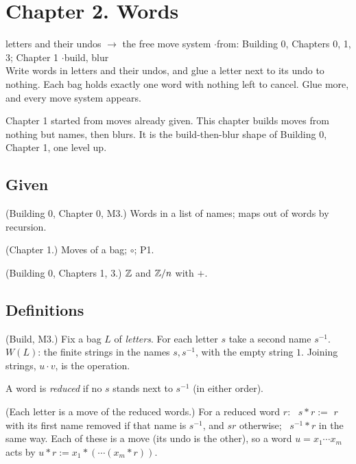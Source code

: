 \section*{Chapter 2. Words}
\begin{center}
{\normalsize letters and their undos $\to$ the free move system \quad$\cdot$\quad from: Building 0, Chapters 0, 1, 3; Chapter 1 \quad$\cdot$\quad build, blur}\\[4pt]
{\small Write words in letters and their undos, and glue a letter next to its undo to nothing. Each bag holds exactly one word with nothing left to cancel. Glue more, and every move system appears.}
\end{center}

Chapter 1 started from moves already given. This chapter builds moves from nothing but names, then blurs. It is the build-then-blur shape of Building 0, Chapter 1, one level up.

\subsection*{Given}

\begin{lines}
\item[\lab{G1}] (Building 0, Chapter 0, M3.) Words in a list of names; maps out of words by recursion.
\item[\lab{G2}] (Chapter 1.) Moves of a bag; $\circ$; P1.
\item[\lab{G3}] (Building 0, Chapters 1, 3.) $\mathbb{Z}$ and $\mathbb{Z}/n$ with $+$.
\end{lines}

\subsection*{Definitions}

\begin{lines}
\item[\lab{D1}] (Build, M3.) Fix a bag $L$ of \emph{letters}. For each letter $s$ take a second name $s^{-1}$. $W(L)$: the finite strings in the names $s, s^{-1}$, with the empty string $1$. Joining strings, $u \cdot v$, is the operation.
\item[\lab{D2}] A word is \emph{reduced} if no $s$ stands next to $s^{-1}$ (in either order).
\item[\lab{D3}] (Each letter is a move of the reduced words.) For a reduced word $r$: \ $s \ast r := $ $r$ with its first name removed if that name is $s^{-1}$, and $s r$ otherwise; \ $s^{-1} \ast r$ in the same way. Each of these is a move (its undo is the other), so a word $u = x_1 \cdots x_m$ acts by $u \ast r := x_1 \ast (\cdots (x_m \ast r))$.
\end{lines}

